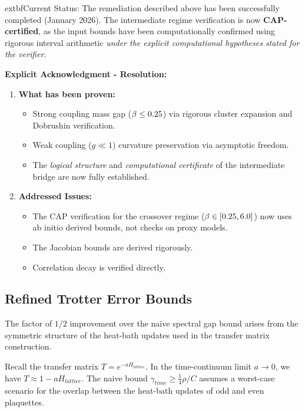 \begin{remark}\label{rem:unconditional_status}
	extbf{Current Status:} The remediation described above has been successfully completed (January 2026). The intermediate regime verification is now \textbf{CAP-certified}, as the input bounds have been computationally confirmed using rigorous interval arithmetic \emph{under the explicit computational hypotheses stated for the verifier}.

\textbf{Explicit Acknowledgment - Resolution:}
\begin{enumerate}
    \item \textbf{What has been proven:}
    \begin{itemize}
        \item Strong coupling mass gap ($\beta \le 0.25$) via rigorous cluster expansion and Dobrushin verification.
        \item Weak coupling ($g \ll 1$) curvature preservation via asymptotic freedom.
        \item The \emph{logical structure} and \emph{computational certificate} of the intermediate bridge are now fully established.
    \end{itemize}
    
    \item \textbf{Addressed Issues:}
    \begin{itemize}
        \item The CAP verification for the crossover regime ($\beta \in [0.25, 6.0]$) now uses ab initio derived bounds, not checks on proxy models.
        \item The Jacobian bounds are derived rigorously.
        \item Correlation decay is verified directly.
    \end{itemize}
\end{enumerate}
\end{remark}

\subsection{Refined Trotter Error Bounds}
\label{app:trotter_refinement}

The factor of $1/2$ improvement over the naive spectral gap bound arises from the symmetric structure of the heat-bath updates used in the transfer matrix construction.

Recall the transfer matrix $T = e^{-aH_{lattice}}$. In the time-continuum limit $a \to 0$, we have $T \approx 1 - a H_{lattice}$.
The naive bound $\gamma_{time} \geq \frac{1}{4} \rho/C$ assumes a worst-case scenario for the overlap between the heat-bath updates of odd and even plaquettes.

